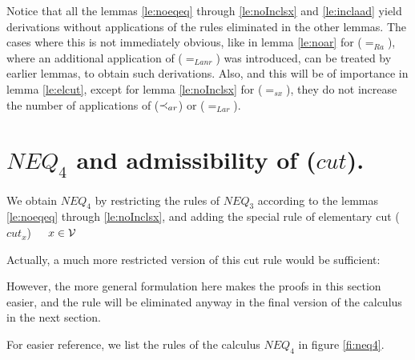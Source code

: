 %
\begin{REMARK}\label{re:noincrease}
Notice that all the lemmas \ref{le:noeqeq} through \ref{le:noInclsx} and
\ref{le:inclaad} yield
derivations without applications of the rules eliminated in the other
lemmas. The cases where this is not immediately obvious, like in lemma \ref{le:noar} for
($=_{Ra}$), where an additional application of ($=_{Lanr}$) was introduced,
can be treated by earlier lemmas, to obtain such derivations. 
Also, and this will be of importance in lemma \ref{le:elcut}, except for
lemma \ref{le:noInclsx} for ($=_{sx}$), they do not
increase the number of applications of ($\mathbin{\prec}_{ar}$) or ($=_{Lar}$).
\end{REMARK}

\section{$NEQ_4$ and admissibility of ($cut$).}
%
\begin{DEFINITION}\label{de:neq4}
We obtain $NEQ_4$ by restricting the rules of $NEQ_3$
according to the lemmas \ref{le:noeqeq} through \ref{le:noInclsx}, and
adding the special  rule of elementary cut 
 ($cut_x$)\ \
\ $x\in{\cal V}$ \label{ru:cutx} 
\end{DEFINITION}
\begin{REMARK}\label{re:cutx}
Actually, a much more restricted
version of this cut rule would be sufficient: 
\begin{center}  \end{center}
However, the more general formulation here makes
the proofs in this section easier, and the rule will be eliminated anyway in the
final version of the calculus in the next section.
\end{REMARK}
\noindent
For easier reference, we list the rules of the calculus $NEQ_4$ in figure
\ref{fi:neq4}.

